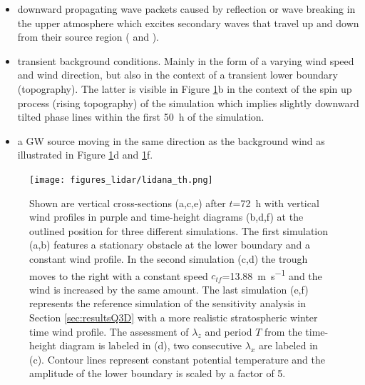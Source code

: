 \begin{itemize}
    \item downward propagating wave packets caused by reflection or wave breaking in the upper atmosphere which excites secondary waves that travel up and down from their source region (\cite[]{dornbrack_interpretation_2017} and \cite[]{vadas_mechanism_2003}).

    \item transient background conditions. Mainly in the form of a varying wind speed and wind direction, but also in the context of a transient lower boundary (topography). The latter is visible in Figure \ref{fig:lidar_sim}b in the context of the spin up process (rising topography) of the simulation which implies slightly downward tilted phase lines within the first \SI{50}{\hour} of the simulation.

    \item a GW source moving in the same direction as the background wind as illustrated in Figure \ref{fig:lidar_sim}d and \ref{fig:lidar_sim}f.
\end{itemize}

\begin{figure}[tbp]
    \centering
    \texttt{[image: figures\_lidar/lidana\_th.png]}
    \caption{Shown are vertical cross-sections (a,c,e) after $t$=\SI{72}{\hour} with vertical wind profiles in purple and time-height diagrams (b,d,f) at the outlined position for three different simulations. The first simulation (a,b) features a stationary obstacle at the lower boundary and a constant wind profile. In the second simulation (c,d) the trough moves to the right with a constant speed $c_{tf}$=\SI{13.88}{\meter \per \second} and the wind is increased by the same amount. The last simulation (e,f) represents the reference simulation of the sensitivity analysis in Section \ref{sec:resultsQ3D} with a more realistic stratospheric winter time wind profile. The assessment of $\lambda_z$ and period $T$ from the time-height diagram is labeled in (d), two consecutive $\lambda_x$ are labeled in (c). Contour lines represent constant potential temperature and the amplitude of the lower boundary is scaled by a factor of 5.}
    \label{fig:lidar_sim}
\end{figure}

